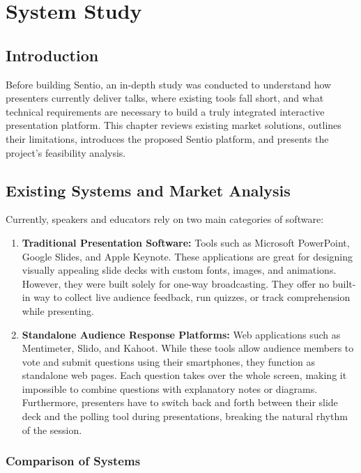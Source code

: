 \chapter{System Study}

\section{Introduction}

Before building Sentio, an in-depth study was conducted to understand how presenters currently deliver talks, where existing tools fall short, and what technical requirements are necessary to build a truly integrated interactive presentation platform. This chapter reviews existing market solutions, outlines their limitations, introduces the proposed Sentio platform, and presents the project's feasibility analysis.

\section{Existing Systems and Market Analysis}

Currently, speakers and educators rely on two main categories of software:

\begin{enumerate}
    \item \textbf{Traditional Presentation Software:} Tools such as Microsoft PowerPoint, Google Slides, and Apple Keynote. These applications are great for designing visually appealing slide decks with custom fonts, images, and animations. However, they were built solely for one-way broadcasting. They offer no built-in way to collect live audience feedback, run quizzes, or track comprehension while presenting.
    
    \item \textbf{Standalone Audience Response Platforms:} Web applications such as Mentimeter, Slido, and Kahoot. While these tools allow audience members to vote and submit questions using their smartphones, they function as standalone web pages. Each question takes over the whole screen, making it impossible to combine questions with explanatory notes or diagrams. Furthermore, presenters have to switch back and forth between their slide deck and the polling tool during presentations, breaking the natural rhythm of the session.
\end{enumerate}

\subsection{Comparison of Systems}

